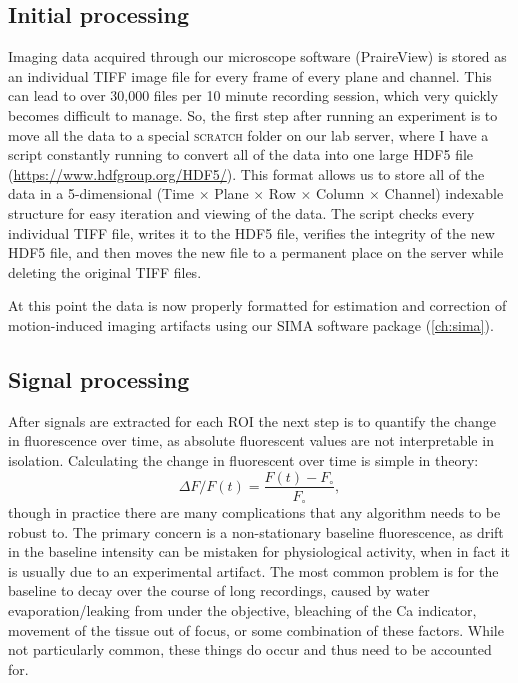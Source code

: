 \subsection{Initial processing}
\label{sec:intro:techniques:inital}
Imaging data acquired through our microscope software (PraireView) is stored as an individual TIFF image file for every frame of every plane and channel.
This can lead to over 30,000 files per 10 minute recording session, which very quickly becomes difficult to manage.
So, the first step after running an experiment is to move all the data to a special \textsc{scratch} folder on our lab server, where I have a script constantly running to convert all of the data into one large HDF5 file (\url{https://www.hdfgroup.org/HDF5/}).
This format allows us to store all of the data in a 5-dimensional (Time $\times$ Plane $\times$ Row $\times$ Column $\times$ Channel) indexable structure for easy iteration and viewing of the data.
The script checks every individual TIFF file, writes it to the HDF5 file, verifies the integrity of the new HDF5 file, and then moves the new file to a permanent place on the server while deleting the original TIFF files.

At this point the data is now properly formatted for estimation and correction of motion-induced imaging artifacts using our SIMA software package (\autoref{ch:sima}).


\subsection{Signal processing}
After signals are extracted for each ROI the next step is to quantify the change in fluorescence over time, as absolute fluorescent values are not interpretable in isolation.
Calculating the change in fluorescent over time is simple in theory: $$\Delta F/F(t) = \frac{F(t) - F_{\circ}}{F_{\circ}},$$ though in practice there are many complications that any algorithm needs to be robust to.
The primary concern is a non-stationary baseline fluorescence, as drift in the baseline intensity can be mistaken for physiological activity, when in fact it is usually due to an experimental artifact.
The most common problem is for the baseline to decay over the course of long recordings, caused by water evaporation/leaking from under the objective, bleaching of the Ca indicator, movement of the tissue out of focus, or some combination of these factors.
While not particularly common, these things do occur and thus need to be accounted for.


